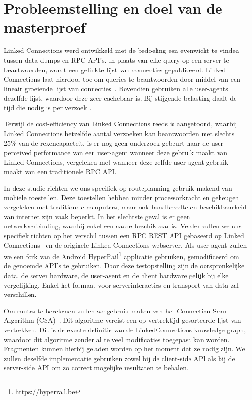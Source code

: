 
\section{Probleemstelling en doel van de masterproef}
\label{sec:problem}

Linked Connections werd ontwikkeld met de bedoeling een evenwicht te vinden tussen data dumps en RPC API's. In plaats van elke query op een server te beantwoorden, wordt een gelinkte lijst van connecties gepubliceerd. Linked Connections laat hierdoor toe om queries te beantwoorden door middel van een lineair groeiende lijst van connecties~\citep{colpaert15}. Bovendien gebruiken alle user-agents dezelfde lijst, waardoor deze zeer cachebaar is. Bij stijgende belasting daalt de tijd die nodig is per verzoek \citep{colpaert17}.

Terwijl de cost-efficiency van Linked Connections reeds is aangetoond, waarbij Linked Connections hetzelfde aantal verzoeken kan beantwoorden met slechts 25\% van de rekencapacteit\citep{colpaert17,Melendez17}, is er nog geen onderzoek gebeurt naar de user-perceived performance van een user-agent wanneer deze gebruik maakt van Linked Connections, vergeleken met wanneer deze zelfde user-agent gebruik maakt van een traditionele RPC API. 

In deze studie richten we ons specifiek op routeplanning gebruik makend van mobiele toestellen. Deze toestellen hebben minder processorkracht en geheugen vergeleken met traditionele computers, maar ook bandbreedte en beschikbaarheid van internet zijn vaak beperkt. In het slechtste geval is er geen netwerkverbinding, waarbij enkel een cache beschikbaar is. Verder zullen we ons specifiek richten op het verschil tussen een RPC REST API gebaseerd op Linked Connections~\citep{colpaert17} en de originele Linked Connections webserver. Als user-agent zullen we een fork van de Android HyperRail\footnote{https://hyperrail.be} applicatie gebruiken, gemodificeerd om de genoemde API's te gebruiken. Door deze testopstelling zijn de oorspronkelijke data, de server hardware, de user-agent en de client hardware gelijk bij elke vergelijking. Enkel het formaat voor serverinteracties en transport van data zal verschillen.

Om routes te berekenen zullen we gebruik maken van het Connection Scan Algorithm (CSA)~\citep{strasser13,strasser14,strasser17}. Dit algoritme vereist een op vertrektijd gesorteerde lijst van vertrekken. Dit is de exacte definitie van de LinkedConnections knowledge graph, waardoor dit algoritme zonder al te veel modificaties toegepast kan worden. Fragmenten kunnen hierbij geladen worden op het moment dat ze nodig zijn. We zullen dezelfde implementatie gebruiken zowel bij de client-side API als bij de server-side API om zo correct mogelijke resultaten te behalen. 

